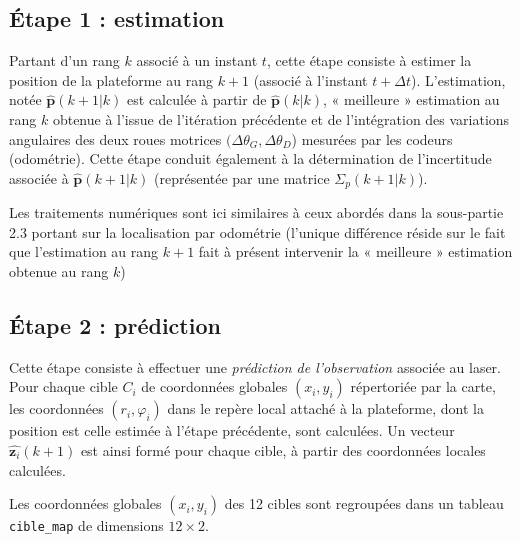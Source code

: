 \subsection*{Étape 1 : estimation}
Partant d’un rang $k$ associé à un instant $t$, cette étape consiste à estimer la position de la plateforme
au rang $k + 1$ (associé à l’instant $t + \Delta t$). L’estimation, notée $\hat{\bm{p}}(k + 1 | k)$ est calculée à partir de $\hat{\bm{p}}(k | k)$,
« meilleure » estimation au rang $k$ obtenue à l’issue de l’itération précédente et de l’intégration des
variations angulaires des deux roues motrices $(\Delta \theta_G, \Delta \theta_D$) mesurées par les codeurs (odométrie). Cette
étape conduit également à la détermination de l’incertitude associée à $\hat{\bm{p}}(k + 1 | k)$ (représentée par une
matrice $\Sigma_p(k + 1 | k)$).

Les traitements numériques sont ici similaires à ceux abordés dans la sous-partie 2.3 portant sur la
localisation par odométrie (l’unique différence réside sur le fait que l’estimation au rang $k + 1$ fait à
présent intervenir la « meilleure » estimation obtenue au rang $k$)


\subsection*{Étape 2 : prédiction}
Cette étape consiste à effectuer une \textit{prédiction de l’observation} associée au laser. Pour chaque cible
$C_i$ de coordonnées globales $(x_i, y_i)$ répertoriée par la carte, les coordonnées $(r_i, \varphi_i)$ dans le repère local
attaché à la plateforme, dont la position est celle estimée à l’étape précédente, sont calculées. Un
vecteur $\hat{\bm{z}_i}(k + 1)$ est ainsi formé pour chaque cible, à partir des coordonnées locales calculées.

Les coordonnées globales $(x_i, y_i)$ des 12 cibles sont regroupées dans un tableau \lstinline{cible_map} de dimensions $12 \times  2$.

